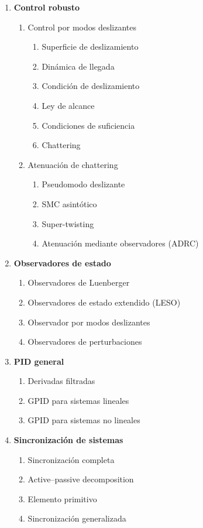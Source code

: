 \begin{enumerate}[label=\arabic*.,leftmargin=*]
    \item \textbf{Control robusto}
    \begin{enumerate}[label*=\arabic*.,leftmargin=*]
        \item Control por modos deslizantes
        \begin{enumerate}[label*=\arabic*.,leftmargin=*]
            \item Superficie de deslizamiento
            \item Dinámica de llegada
            \item Condición de deslizamiento
            \item Ley de alcance
            \item Condiciones de suficiencia
            \item Chattering
        \end{enumerate}
        \item Atenuación de chattering
        \begin{enumerate}[label*=\arabic*.,leftmargin=*]
            \item Pseudomodo deslizante
            \item SMC asintótico
            \item Super-twisting
            \item Atenuación mediante observadores (ADRC)
        \end{enumerate}
    \end{enumerate}

    \item \textbf{Observadores de estado}
    \begin{enumerate}[label*=\arabic*.,leftmargin=*]
        \item Observadores de Luenberger
        \item Observadores de estado extendido (LESO)
        \item Observador por modos deslizantes
        \item Observadores de perturbaciones
    \end{enumerate}

    \item \textbf{PID general}
    \begin{enumerate}[label*=\arabic*.,leftmargin=*]
        \item Derivadas filtradas
        \item GPID para sistemas lineales
        \item GPID para sistemas no lineales
    \end{enumerate}

    \item \textbf{Sincronización de sistemas}
    \begin{enumerate}[label*=\arabic*.,leftmargin=*]
        \item Sincronización completa
        \item Active--passive decomposition
        \item Elemento primitivo
        \item Sincronización generalizada
    \end{enumerate}
\end{enumerate}

\clearpage
